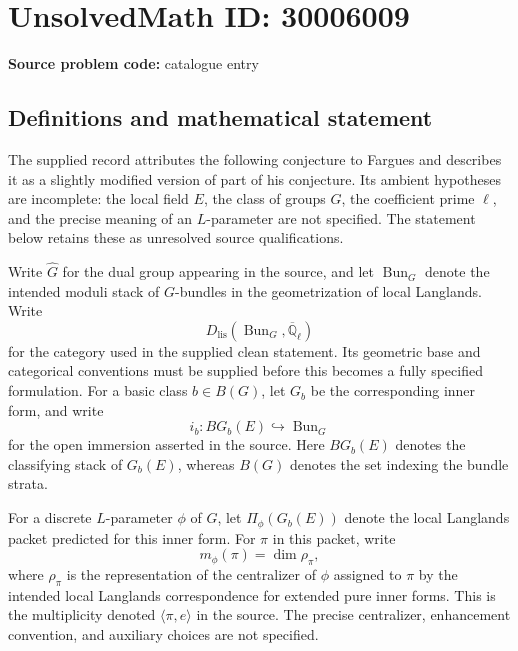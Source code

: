 \documentclass[11pt]{article}
\newcommand{\Q}{\mathbb{Q}}
\begin{document}
\section*{UnsolvedMath ID: 30006009}
\textbf{Source problem code:} catalogue entry
\subsection{Definitions and mathematical statement}
The supplied record attributes the following conjecture to Fargues and describes it as a slightly modified version of part of his conjecture. Its ambient hypotheses are incomplete: the local field \(E\), the class of groups \(G\), the coefficient prime \(\ell\), and the precise meaning of an \(L\)-parameter are not specified. The statement below retains these as unresolved source qualifications.

Write \(\widehat G\) for the dual group appearing in the source, and let \(\operatorname{Bun}_G\) denote the intended moduli stack of \(G\)-bundles in the geometrization of local Langlands. Write
\[
D_{\mathrm{lis}}(\operatorname{Bun}_G,\overline{\Q}_\ell)
\]
for the category used in the supplied clean statement. Its geometric base and categorical conventions must be supplied before this becomes a fully specified formulation. For a basic class \(b\in B(G)\), let \(G_b\) be the corresponding inner form, and write
\[
i_b:B G_b(E)\hookrightarrow\operatorname{Bun}_G
\]
for the open immersion asserted in the source. Here \(B G_b(E)\) denotes the classifying stack of \(G_b(E)\), whereas \(B(G)\) denotes the set indexing the bundle strata.

For a discrete \(L\)-parameter \(\phi\) of \(G\), let \(\Pi_\phi(G_b(E))\) denote the local Langlands packet predicted for this inner form. For \(\pi\) in this packet, write
\[
m_\phi(\pi)=\dim\rho_\pi,
\]
where \(\rho_\pi\) is the representation of the centralizer of \(\phi\) assigned to \(\pi\) by the intended local Langlands correspondence for extended pure inner forms. This is the multiplicity denoted \(\langle\pi,e\rangle\) in the source. The precise centralizer, enhancement convention, and auxiliary choices are not specified.
\end{document}
